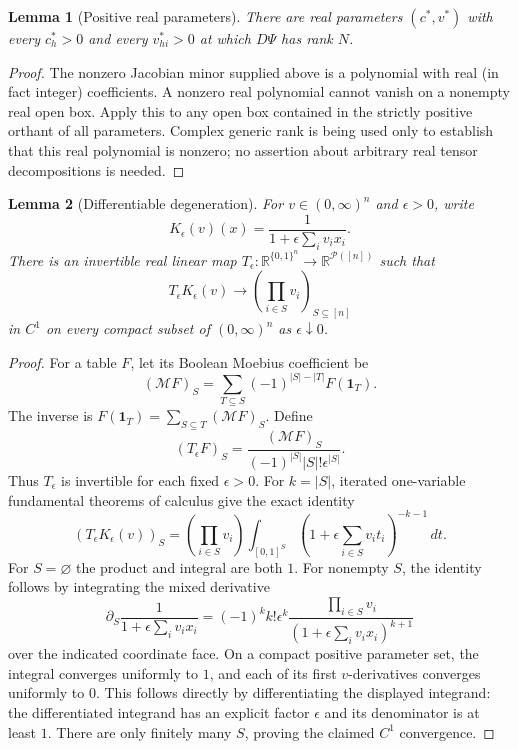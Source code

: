 \documentclass[11pt]{article}
\newtheorem{lemma}{Lemma}
\begin{document}
\begin{lemma}[Positive real parameters]\label{lem:positive}
There are real parameters $(c^*,v^*)$ with every $c^*_h>0$ and
every $v^*_{hi}>0$ at which $D\Psi$ has rank $N$.
\end{lemma}
\begin{proof}
The nonzero Jacobian minor supplied above is a polynomial with real
(in fact integer) coefficients. A nonzero real polynomial cannot
vanish on a nonempty real open box. Apply this to any open box
contained in the strictly positive orthant of all parameters.
Complex generic rank is being used only to establish that this
real polynomial is nonzero; no assertion about arbitrary real
tensor decompositions is needed.
\end{proof}

\begin{lemma}[Differentiable degeneration]\label{lem:degeneration}
For $v\in(0,\infty)^n$ and $\epsilon>0$, write
\[
 K_\epsilon(v)(x)=\frac1{1+\epsilon\sum_i v_i x_i}.
\]
There is an invertible real linear map
$T_\epsilon:\mathbb R^{\{0,1\}^n}\to
\mathbb R^{\mathcal P([n])}$ such that
\[
 T_\epsilon K_\epsilon(v)\longrightarrow
       \left(\prod_{i\in S}v_i\right)_{S\subseteq[n]}
\]
in $C^1$ on every compact subset of $(0,\infty)^n$ as
$\epsilon\downarrow0$.
\end{lemma}
\begin{proof}
For a table $F$, let its Boolean Moebius coefficient be
\[
 (\mathcal M F)_S
   =\sum_{T\subseteq S}(-1)^{|S|-|T|}F(\boldsymbol1_T).
\]
The inverse is $F(\boldsymbol1_T)=\sum_{S\subseteq T}(\mathcal M F)_S$.
Define
\[
 (T_\epsilon F)_S
   =\frac{(\mathcal M F)_S}{(-1)^{|S|}|S|!\epsilon^{|S|}}.
\]
Thus $T_\epsilon$ is invertible for each fixed $\epsilon>0$.
For $k=|S|$, iterated one-variable fundamental theorems of calculus
give the exact identity
\[
 (T_\epsilon K_\epsilon(v))_S
 =\left(\prod_{i\in S}v_i\right)
   \int_{[0,1]^S}
      \left(1+\epsilon\sum_{i\in S}v_i t_i\right)^{-k-1}\,dt.
\]
For $S=\varnothing$ the product and integral are both $1$.
For nonempty $S$, the identity follows by integrating the mixed
derivative
\[
 \partial_S\frac1{1+\epsilon\sum_i v_i x_i}
 =(-1)^k k!\epsilon^k
     \frac{\prod_{i\in S}v_i}
          {(1+\epsilon\sum_i v_i x_i)^{k+1}}
\]
over the indicated coordinate face. On a compact positive parameter
set, the integral converges uniformly to $1$, and each of its first
$v$-derivatives converges uniformly to $0$. This follows directly
by differentiating the displayed integrand: the differentiated
integrand has an explicit factor $\epsilon$ and its denominator
is at least $1$. There are only finitely many $S$, proving the
claimed $C^1$ convergence.
\end{proof}
\end{document}
